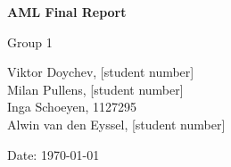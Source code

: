 \begin{titlepage}
    \begin{center}
        \vspace*{1cm}
        
        \Huge
        \textbf{AML Final Report}
        
        \vspace{0.5cm}
        \LARGE
        Group 1
        
        \vfill
        
        \Large
        Viktor Doychev, [student number]\\
        Milan Pullens, [student number]\\
        Inga Schoeyen, 1127295\\
        Alwin van den Eyssel, [student number]\\
        
        \vspace{0.8cm}
        
        \Large
        Date: \today
        
    \end{center}
\end{titlepage}